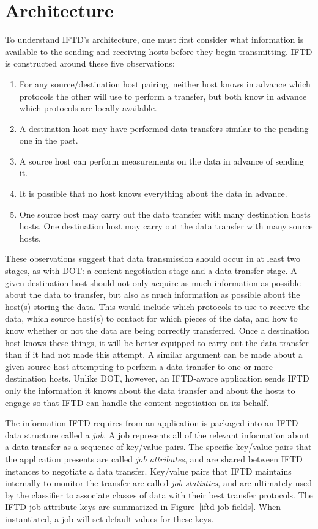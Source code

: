 \section{Architecture}

To understand IFTD's architecture, one must first consider what information is available to the sending and receiving hosts before they begin transmitting.  IFTD is constructed around these five observations:
\begin{enumerate}
\item For any source/destination host pairing, neither host knows in advance which protocols the other will use to perform a transfer, but both know in advance which protocols are locally available.
\item A destination host may have performed data transfers similar to the pending one in the past.
\item A source host can perform measurements on the data in advance of sending it.
\item It is possible that no host knows everything about the data in advance.
\item One source host may carry out the data transfer with many destination hosts hosts.  One destination host may carry out the data transfer with many source hosts.
\end{enumerate}

These observations suggest that data transmission should occur in at least two stages, as with DOT: a content negotiation stage and a data transfer stage.  A given destination host should not only acquire as much information as possible about the data to transfer, but also as much information as possible about the host(s) storing the data.  This would include which protocols to use to receive the data, which source host(s) to contact for which pieces of the data, and how to know whether or not the data are being correctly transferred.  Once a destination host knows these things, it will be better equipped to carry out the data transfer than if it had not made this attempt.  A similar argument can be made about a given source host attempting to perform a data transfer to one or more destination hosts.  Unlike DOT, however, an IFTD-aware application sends IFTD only the information it knows about the data transfer and about the hosts to engage so that IFTD can handle the content negotiation on its behalf.

The information IFTD requires from an application is packaged into an IFTD data structure called a \textit{job}.  A job represents all of the relevant information about a data transfer as a sequence of key/value pairs.  The specific key/value pairs that the application presents are called \textit{job attributes}, and are shared between IFTD instances to negotiate a data transfer.  Key/value pairs that IFTD maintains internally to monitor the transfer are called \textit{job statistics}, and are ultimately used by the classifier to associate classes of data with their best transfer protocols.  The IFTD job attribute keys are summarized in Figure~\ref{iftd-job-fields}.  When instantiated, a job will set default values for these keys.

